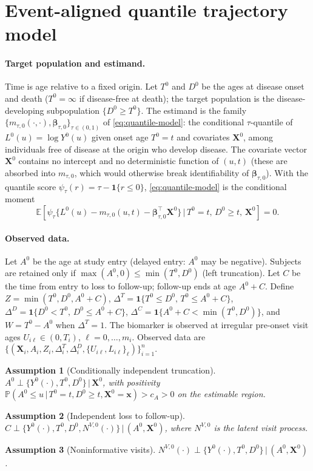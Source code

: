 \documentclass[11pt]{article}
\newtheorem{assumption}{Assumption}
\newcommand{\E}{\mathbb{E}}
\newcommand{\PR}{\mathbb{P}}
\newcommand{\X}{\bm{X}}
\newcommand{\bbeta}{\bm{\beta}}
\newcommand{\indc}[1]{\mathbf{1}\{#1\}}
\newcommand{\given}{\,\vert\,}
\begin{document}
\section{Event-aligned quantile trajectory model}\label{sec:model}

\paragraph{Target population and estimand.}
Time is age relative to a fixed origin. Let $T^0$ and $D^0$ be the ages at disease
onset and death ($T^0=\infty$ if disease-free at death); the target population is
the disease-developing subpopulation $\{D^0\ge T^0\}$. The estimand is the family
$\{m_{\tau,0}(\cdot,\cdot),\bbeta_{\tau,0}\}_{\tau\in(0,1)}$ of
\eqref{eq:quantile-model}: the conditional $\tau$-quantile of $L^0(u)=\log Y^0(u)$
given onset age $T^0=t$ and covariates $\X^0$, among individuals free of disease at
the origin who develop disease. The covariate vector $\X^0$ contains no intercept
and no deterministic function of $(u,t)$ (these are absorbed into $m_{\tau,0}$,
which would otherwise break identifiability of $\bbeta_{\tau,0}$). With the
quantile score $\psi_\tau(r)=\tau-\indc{r\le0}$, \eqref{eq:quantile-model} is the
conditional moment
\begin{equation}
\E\!\left[\psi_\tau\{L^0(u)-m_{\tau,0}(u,t)-\bbeta_{\tau,0}^\top\X^0\}
   \given T^0=t,\,D^0\ge t,\,\X^0\right]=0 .
\label{eq:moment}
\end{equation}

\paragraph{Observed data.}
Let $A^0$ be the age at study entry (delayed entry: $A^0$ may be negative).
Subjects are retained only if $\max(A^0,0)\le\min(T^0,D^0)$ (left truncation). Let
$C$ be the time from entry to loss to follow-up; follow-up ends at age $A^0+C$.
Define $Z=\min(T^0,D^0,A^0+C)$, $\Delta^T=\indc{T^0\le D^0,\,T^0\le A^0+C}$,
$\Delta^D=\indc{D^0<T^0,\,D^0\le A^0+C}$, $\Delta^C=\indc{A^0+C<\min(T^0,D^0)}$, and
$W=T^0-A^0$ when $\Delta^T=1$. The biomarker is observed at irregular pre-onset
visit ages $U_{i\ell}\in(0,T_i)$, $\ell=0,\dots,m_i$. Observed data are
$\{(\X_i,A_i,Z_i,\Delta_i^T,\Delta_i^D,\{U_{i\ell},L_{i\ell}\}_\ell)\}_{i=1}^n$.

\begin{assumption}[Conditionally independent truncation]\label{as:trunc}
$A^0\perp\{Y^0(\cdot),T^0,D^0\}\given\X^0$, with positivity
$\PR(A^0\le u\given T^0=t,D^0\ge t,\X^0=\bm x)>c_A>0$ on the estimable region.
\end{assumption}
\begin{assumption}[Independent loss to follow-up]\label{as:cens}
$C\perp\{Y^0(\cdot),T^0,D^0,N^{V,0}(\cdot)\}\given(A^0,\X^0)$, where $N^{V,0}$ is the
latent visit process.
\end{assumption}
\begin{assumption}[Noninformative visits]\label{as:visit}
$N^{V,0}(\cdot)\perp\{Y^0(\cdot),T^0,D^0\}\given(A^0,\X^0)$.
\end{assumption}
\end{document}
